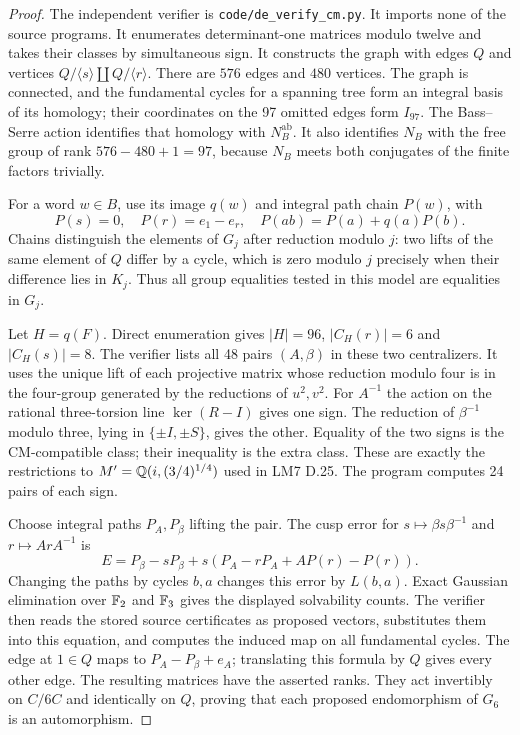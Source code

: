 \begin{proof}
The independent verifier is \texttt{code/de\_verify\_cm.py}.
It imports none of the source programs. It enumerates determinant-one
matrices modulo twelve and takes their classes by simultaneous sign.
It constructs the graph with edges $Q$ and vertices
$Q/\langle s\rangle\amalg Q/\langle r\rangle$. There are $576$
edges and $480$ vertices. The graph is connected, and the fundamental
cycles for a spanning tree form an integral basis of its homology;
their coordinates on the 97 omitted edges form $I_{97}$.
The Bass--Serre action identifies that homology with $N_B^{\mathrm{ab}}$.
It also identifies $N_B$ with the free group of rank $576-480+1=97$,
because $N_B$ meets both conjugates of the finite factors trivially.

For a word $w\in B$, use its image $q(w)$ and integral path chain
$P(w)$, with
\[
 P(s)=0,\quad P(r)=e_1-e_r,\quad
 P(ab)=P(a)+q(a)P(b).
\]
Chains distinguish the elements of $G_j$ after reduction modulo $j$:
two lifts of the same element of $Q$ differ by a cycle, which is zero
modulo $j$ precisely when their difference lies in $K_j$. Thus all
group equalities tested in this model are equalities in $G_j$.

Let $H=q(F)$. Direct enumeration gives $|H|=96$,
$|C_H(r)|=6$ and $|C_H(s)|=8$.
The verifier lists all 48 pairs $(A,\beta)$ in these two centralizers.
It uses the unique lift of each projective matrix whose reduction
modulo four is in the four-group generated by the reductions of
$u^2,v^2$. For $A^{-1}$ the action on the rational three-torsion line
$\ker(R-I)$ gives one sign. The reduction of $\beta^{-1}$ modulo
three, lying in $\{\pm I,\pm S\}$, gives the other. Equality of the
two signs is the CM-compatible class; their inequality is the extra
class. These are exactly the restrictions to
$M'=\mathbb Q(i,(3/4)^{1/4})$ used in LM7 D.25. The program computes
24 pairs of each sign.

Choose integral paths $P_A,P_\beta$ lifting the pair. The cusp error
for $s\mapsto\beta s\beta^{-1}$ and $r\mapsto ArA^{-1}$ is
\[
 E=P_\beta-sP_\beta+
       s(P_A-rP_A+A P(r)-P(r)).
\]
Changing the paths by cycles $b,a$ changes this error by $L(b,a)$.
Exact Gaussian elimination over $\mathbb F_2$ and $\mathbb F_3$ gives the displayed
solvability counts. The verifier then reads the stored source
certificates as proposed vectors, substitutes them into this equation,
and computes the induced map on all fundamental cycles. The edge at
$1\in Q$ maps to
$P_A-P_\beta+e_A$; translating this formula by $Q$ gives every other
edge. The resulting matrices have the asserted ranks. They act
invertibly on $C/6C$ and identically on $Q$, proving that each proposed
endomorphism of $G_6$ is an automorphism.


\end{proof}
